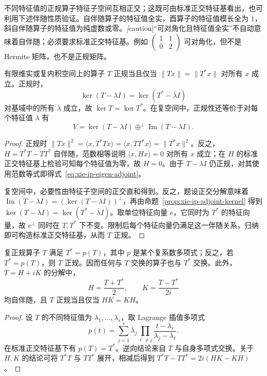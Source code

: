 不同特征值的正规算子特征子空间互相正交；这既可由标准正交特征基看出，也可利用下述伴随性质验证。自伴随算子的特征值全实，酉算子的特征值模长全为 $1$，斜自伴随算子的特征值为纯虚数或零。\emph[caution]{“可对角化且特征值全实”不自动意味着自伴随；必须要求标准正交特征基。}例如 $\begin{pmatrix}1&1\\0&2\end{pmatrix}$ 可对角化，但不是 Hermite 矩阵，也不是正规矩阵。

\begin{proposition}
\label{prop:xie-ip-normal-tests}
有限维实或复内积空间上的算子 $T$ 正规当且仅当 $\|Tx\|=\|T^*x\|$ 对所有 $x$ 成立。正规时，
\begin{equation}
\label{eq:xie-ip-eigen-adjoint}
\ker(T-\lambda I)=\ker(T^*-\bar\lambda I)
\end{equation}
对基域中的所有 $\lambda$ 成立，故 $\ker T=\ker T^*$。在复空间中，正规性还等价于对每个特征值 $\lambda$ 有
\[
V=\ker(T-\lambda I)\mathbin{\oplus^\perp}\operatorname{Im}(T-\lambda I).
\]
\end{proposition}
\begin{proof}
正规时 $\|Tx\|^2=\langle x,T^*Tx\rangle=\langle x,TT^*x\rangle=\|T^*x\|^2$。反之，$H=T^*T-TT^*$ 自伴随，范数相等说明 $\langle x,Hx\rangle=0$ 对所有 $x$ 成立；在 $H$ 的标准正交特征基上检验可知每个特征值为零，故 $H=0$。由于 $T-\lambda I$ 仍正规，对其使用范数等式即得式~\eqref{eq:xie-ip-eigen-adjoint}。

复空间中，必要性由特征子空间的正交直和得到。反之，题设正交分解意味着 $\operatorname{Im}(T-\lambda I)=(\ker(T-\lambda I))^\perp$，再由命题~\ref{prop:xie-ip-adjoint-kernel} 得到 $\ker(T-\lambda I)=\ker(T^*-\bar\lambda I)$。取单位特征向量 $e$，它同时为 $T^*$ 的特征向量，故 $e^\perp$ 同时在 $T,T^*$ 下不变。限制后每个特征向量仍满足这一伴随关系，归纳即可构造标准正交特征基，从而 $T$ 正规。
\end{proof}

\begin{proposition}
\label{prop:xie-ip-normal-polynomial}
复正规算子 $T$ 满足 $T^*=p(T)$，其中 $p$ 是某个复系数多项式；反之，若 $T^*=p(T)$，则 $T$ 正规。因而任何与 $T$ 交换的算子也与 $T^*$ 交换。此外，$T=H+iK$ 的分解中，
\[
H=\frac{T+T^*}{2},\qquad K=\frac{T-T^*}{2i}
\]
均自伴随，且 $T$ 正规当且仅当 $HK=KH$。
\end{proposition}
\begin{proof}
设 $T$ 的不同特征值为 $\lambda_1,\ldots,\lambda_s$，取 Lagrange 插值多项式
\[
p(t)=\sum_{j=1}^s\bar\lambda_j
\prod_{\ell\ne j}\frac{t-\lambda_\ell}{\lambda_j-\lambda_\ell}.
\]
在标准正交特征基下有 $p(T)=T^*$。逆向结论来自 $T$ 与自身多项式交换。关于 $H,K$ 的结论可将 $T^*T$ 与 $TT^*$ 展开，相减后得到 $T^*T-TT^*=2i(HK-KH)$。
\end{proof}

